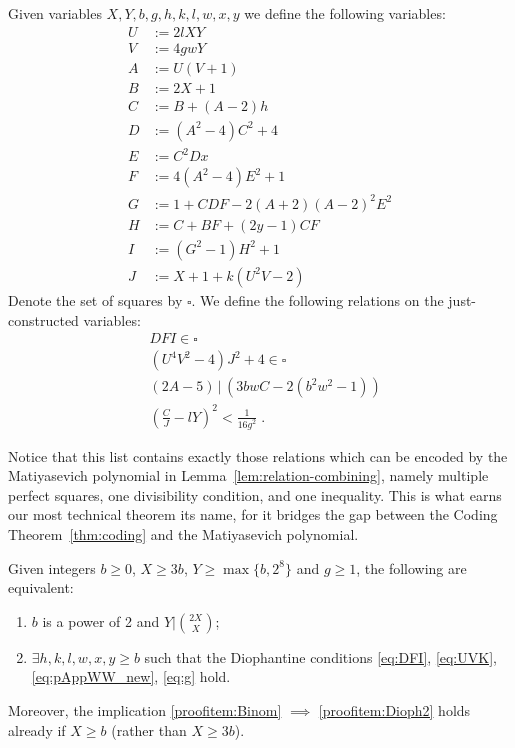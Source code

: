 \documentclass[a4paper,USenglish,cleveref,autoref,thm-restate]{lipics-v2021}
\begin{document}
\begin{definition}
\label{def:VariableDefinition}
Given variables $X,Y,b,g,h,k,l,w,x,y$ we define the following variables:
\begin{subequations}\label{eqs:VariableDefinition}
\begin{align}
U &:= 2lXY \label{eq:Def_U} \\
V &:= 4gwY \label{eq:Def_V} \\
A &:= U(V+1) \label{eq:Def_A} \\
B &:= 2X+1 \label{eq:Def_B} \\
C &:= B+(A-2)h \label{eq:Def_C} \\
D &:= (A^2-4)C^2+4 \label{eq:Def_D} \\
E &:= C^2Dx \label{eq:Def_E} \\
F &:= 4(A^2-4)E^2+1 \label{eq:Def_F} \\
G &:= 1+CDF-2(A+2)(A-2)^2E^2 \label{eq:Def_G} \\
H &:= C+BF+(2y-1)CF \label{eq:Def_H} \\
I &:= (G^2-1)H^2+1 \label{eq:Def_I} \\
J &:= X+1+k(U^2V-2) \label{eq:Def_J}
\end{align}
\end{subequations}
Denote the set of squares by $\square$. We define the following relations on the just-constructed variables:
\begin{subequations}\label{eqs:thm2-properties}
\begin{align}
&DFI \in \square \label{eq:DFI} \\
&(U^{4}V^2-4)J^2+4\in\square \label{eq:UVK} \\
&(2A-5) \,\big|\, (3bwC-2(b^2w^2-1)) \label{eq:pAppWW_new}\\
& \left(\frac{C}{J}-lY\right)^2 < \frac{1}{16g^2} \label{eq:g}
\;.
\end{align}
\end{subequations}
\end{definition}
Notice that this list contains exactly those relations which can be encoded by the Matiyasevich polynomial in Lemma~\ref{lem:relation-combining}, namely multiple perfect squares, one divisibility condition, and one inequality. This is what earns our most technical theorem its name, for it bridges the gap between the Coding Theorem~\ref{thm:coding} and the Matiyasevich polynomial.

\begin{theorem} \label{thm:lucas}
Given integers $b\ge 0$, $X\geq 3b$, $Y\geq \max \{ b,2^8 \}$ and $g\ge 1$, the following are equivalent:
\begin{enumerate}
\item \label{proofitem:Binom} $b$ is a power of 2 and $Y | \binom{2 X}{X}$;
\item \label{proofitem:Dioph2} $\exists h,k,l,w,x,y\geq b$ such that the Diophantine conditions \eqref{eq:DFI}, \eqref{eq:UVK}, \eqref{eq:pAppWW_new}, \eqref{eq:g} hold.
\end{enumerate}
Moreover, the implication \eqref{proofitem:Binom} $\implies$ \eqref{proofitem:Dioph2} holds already if $X\ge b$ (rather than $X\ge 3b$).
\end{theorem}
\end{document}
